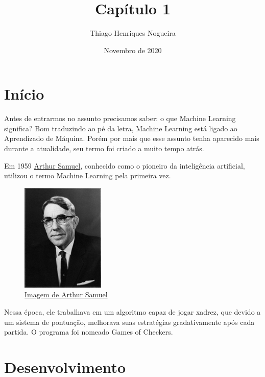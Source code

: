 \documentclass{article}
\title{Capítulo 1}
\author{Thiago Henriques Nogueira}
\date{Novembro de 2020}
\begin{document}
    
    \maketitle

    \Large
    
    \section{Início}

    Antes de entrarmos no assunto precisamos saber: o que Machine Learning significa? Bom traduzindo ao 
    pé da letra, Machine Learning está ligado ao Aprendizado de Máquina. Porém por mais que esse 
    assunto tenha aparecido mais durante a atualidade, seu termo foi criado a muito tempo atrás.

    Em 1959 \href{https://en.wikipedia.org/wiki/Arthur_Samuel}{Arthur Samuel}, conhecido como o 
    pioneiro da inteligência artificial, utilizou o termo Machine Learning pela primeira vez. 

    \begin{figure}[htp]
        \centering
        \includegraphics[scale=1.5]{ArthurSamuel.jpg}
        \caption{\href{https://youtu.be/pbVwH8o837A}{Imagem de Arthur Samuel}}
    \end{figure}

    Nessa época, ele trabalhava em um algoritmo capaz de jogar xadrez, que devido a um sistema de
    pontuação, melhorava suas estratégias gradativamente após cada partida. O programa foi nomeado
    Games of Checkers.

    \newpage
    \section{Desenvolvimento} 
\end{document}
